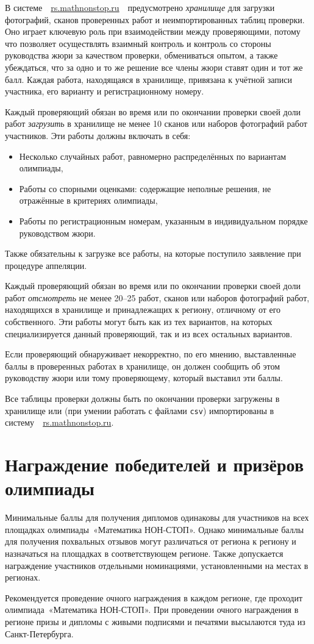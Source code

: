 \documentclass[a4paper,12pt]{article}
\newcommand{\mns}{«Математика НОН-СТОП»\xspace}
\begin{document}
В системе\ \ \url{rs.mathnonstop.ru}\ \ предусмотрено {\it хранилище} для загрузки фотографий, сканов проверенных работ и неимпортированных таблиц проверки. Оно играет ключевую роль при взаимодействии между проверяющими, потому что позволяет осуществлять взаимный контроль и контроль со стороны руководства жюри за качеством проверки, обмениваться опытом, а также убеждаться, что за одно и то же решение все члены жюри ставят один и тот же балл. Каждая работа, находящаяся в хранилище, привязана к учётной записи участника, его варианту и регистрационному номеру.

Каждый проверяющий обязан во время или по окончании проверки своей доли работ {\it загрузить} в хранилище не менее 10 сканов или наборов фотографий работ участников. Эти работы должны включать в себя: \vspace{-4mm}

\begin{itemize}
	\item Несколько случайных работ, равномерно распределённых по вариантам олимпиады,
	\item Работы со спорными оценками: содержащие неполные решения, не отражённые в критериях олимпиады,
	\item Работы по регистрационным номерам, указанным в индивидуальном порядке руководством жюри.
\end{itemize}

Также обязательны к загрузке все работы, на которые поступило заявление при процедуре аппеляции.

Каждый проверяющий обязан во время или по окончании проверки своей доли работ {\it отсмотреть} не менее 20–25 работ, сканов или наборов фотографий работ, находящихся в хранилище и принадлежащих к региону, отличному от его собственного. Эти работы могут быть как из тех вариантов, на которых специализируется данный проверяющий, так и из всех остальных вариантов.

Если проверяющий обнаруживает некорректно, по его мнению, выставленные баллы в проверенных работах в хранилище, он должен сообщить об этом руководству жюри или тому проверяющему, который выставил эти баллы.

Все таблицы проверки должны быть по окончании проверки загружены в хранилище или (при умении работать с файлами {\tt csv}) импортированы в систему\ \ \url{rs.mathnonstop.ru}.

\section{Награждение победителей и призёров олимпиады}

Минимальные баллы для получения дипломов одинаковы для участников на всех площадках олимпиады~\mns. Однако минимальные баллы для получения похвальных отзывов могут различаться от региона к региону и назначаться на площадках в соответствующем регионе. Также допускается награждение участников отдельными номинациями, установленными на местах в регионах.

Рекомендуется проведение очного награждения в каждом регионе, где проходит олимпиада~\mns. При проведении очного награждения в регионе призы и дипломы с живыми подписями и печатями высылаются туда из Санкт-Петербурга.
\end{document}
